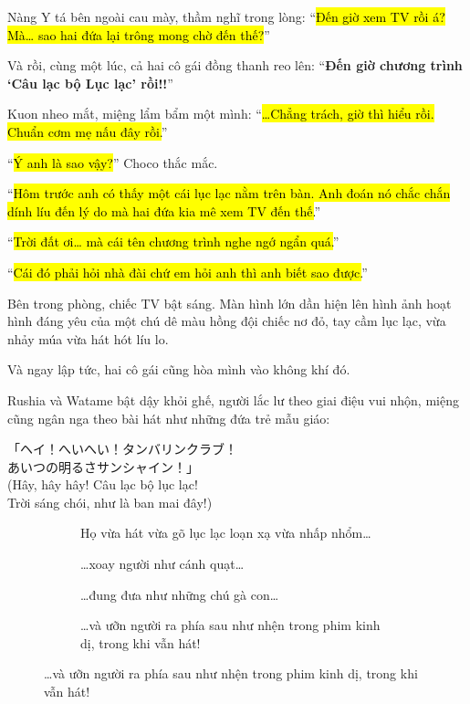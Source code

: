 \documentclass[../main.tex]{subfiles}
\begin{document}
Nàng Y tá bên ngoài cau mày, thầm nghĩ trong lòng: ``\hl{Đến giờ xem TV rồi á? Mà\dots{} sao hai đứa lại trông mong chờ đến thế?}''

Và rồi, cùng một lúc, cả hai cô gái đồng thanh reo lên: ``\textbf{Đến giờ chương trình `Câu lạc bộ Lục lạc' rồi!!}''

Kuon nheo mắt, miệng lẩm bẩm một mình: ``\hl{\dots Chẳng trách, giờ thì hiểu rồi. Chuẩn cơm mẹ nấu đây rồi.}''

``\hl{Ý anh là sao vậy?}'' Choco thắc mắc.

``\hl{Hôm trước anh có thấy một cái lục lạc nằm trên bàn. Anh đoán nó chắc chắn dính líu đến lý do mà hai đứa kia mê xem TV đến thế.}''

``\hl{Trời đất ơi\dots{} mà cái tên chương trình nghe ngớ ngẩn quá.}''

``\hl{Cái đó phải hỏi nhà đài chứ em hỏi anh thì anh biết sao được.}''

Bên trong phòng, chiếc TV bật sáng. Màn hình lớn dần hiện lên hình ảnh hoạt hình đáng yêu của một chú dê màu hồng đội chiếc nơ đỏ, tay cầm lục lạc, vừa nhảy múa vừa hát hót líu lo.

Và ngay lập tức, hai cô gái cũng hòa mình vào không khí đó.

Rushia và Watame bật dậy khỏi ghế, người lắc lư theo giai điệu vui nhộn, miệng cũng ngân nga theo bài hát như những đứa trẻ mẫu giáo:

\begin{center}
  「ヘイ！へいへい！タンバリンクラブ！\\
  あいつの明るさサンシャイン！」\\
  (Hây, hây hây! Câu lạc bộ lục lạc!\\
  Trời sáng chói, như là ban mai đây!)
\end{center}

\begin{figure}[H]
  \centering
  \begin{subfigure}[t]{0.45\textwidth}
    \centering
    \caption{Họ vừa hát vừa gõ lục lạc loạn xạ vừa nhấp nhổm\dots}
  \end{subfigure}
  \quad
  \begin{subfigure}[t]{0.45\textwidth}
    \centering
    \caption{\dots xoay người như cánh quạt\dots}
  \end{subfigure}
  \quad
  \begin{subfigure}[t]{0.45\textwidth}
    \centering
    \caption{\dots đung đưa như những chú gà con\dots}
  \end{subfigure}
  \quad
  \begin{subfigure}[t]{0.45\textwidth}
    \centering
    \caption{\dots và ưỡn người ra phía sau như nhện trong phim kinh dị, trong khi vẫn hát!}
  \end{subfigure}
\end{figure}
\end{document}
